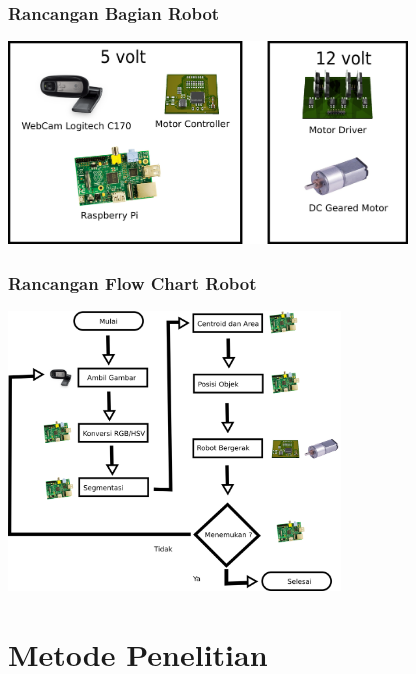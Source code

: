 \documentclass[table,dvipsnames]{beamer}
\begin{document}
\begin{frame}
 \frametitle{Rancangan Bagian Robot}
 \begin{center}
 \includegraphics[width=300pt]{./bagian_robot/parts.png}
\end{center}
\end{frame}

\begin{frame}
\frametitle{Rancangan Flow Chart Robot}
\begin{center}
 \includegraphics[width=250pt]{./proses_robot/process}
\end{center}
\end{frame}


\section{Metode Penelitian}
\end{document}
